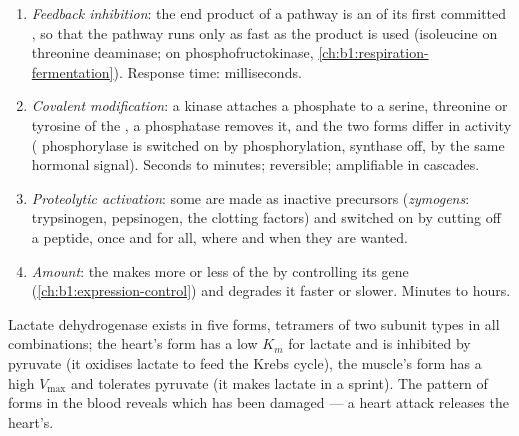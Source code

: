 \begin{proposition}\label{prop:b1:enzymes:control}
\begin{enumerate}
  \item \emph{Feedback inhibition}: the end
        product of a pathway is an   of its first
        committed , so that the pathway runs only as fast as the
        product is used (isoleucine on threonine deaminase;  on
        phosphofructokinase, \cref{ch:b1:respiration-fermentation}).
        Response time: milliseconds.
  \item \emph{Covalent modification}:
        a kinase attaches a phosphate to a serine, threonine or
        tyrosine of the , a phosphatase removes it, and the two
        forms differ in activity ( phosphorylase is switched on
        by phosphorylation,  synthase off, by the same
        hormonal signal). Seconds to minutes; reversible; amplifiable
        in cascades.
  \item \emph{Proteolytic activation}: some  are made as
        inactive precursors (\emph{zymogens}: trypsinogen,
        pepsinogen, the clotting factors) and switched on by cutting
        off a peptide, once and for all, where and when they are
        wanted.
  \item \emph{Amount}: the  makes more or less of the  by
        controlling its gene (\cref{ch:b1:expression-control}) and
        degrades it faster or slower. Minutes to hours.
\end{enumerate}
\end{proposition}

\begin{example}[Isoenzymes]\label{ex:b1:enzymes:isoenzymes}
Lactate dehydrogenase exists in five forms, tetramers of two subunit
types in all combinations; the heart's form has a low $K_m$ for
lactate and is inhibited by pyruvate (it oxidises lactate to feed the
Krebs cycle), the muscle's form has a high $V_{\max}$ and tolerates
pyruvate (it makes lactate in a sprint). The pattern of forms in the
blood reveals which  has been damaged --- a heart attack releases
the heart's.
\end{example}

